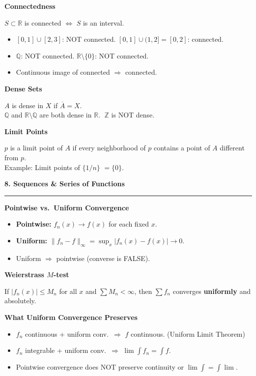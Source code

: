 \documentclass[10pt,twocolumn]{article}
\newcommand{\sect}[1]{\medskip\noindent\textbf{\large #1}\medskip\hrule\smallskip}
\newcommand{\subsect}[1]{\smallskip\noindent\textbf{#1}\par}
\begin{document}
\subsect{Connectedness}
$S\subset\mathbb{R}$ is connected $\iff$ $S$ is an interval.
\begin{itemize}[nosep,leftmargin=*]
\item $[0,1]\cup[2,3]$: NOT connected. \quad $[0,1]\cup(1,2]=[0,2]$: connected.
\item $\mathbb{Q}$: NOT connected. \quad $\mathbb{R}\setminus\{0\}$: NOT connected.
\item Continuous image of connected $\Rightarrow$ connected.
\end{itemize}

\subsect{Dense Sets}
$A$ is dense in $X$ if $\overline{A}=X$.\\
$\mathbb{Q}$ and $\mathbb{R}\setminus\mathbb{Q}$ are both dense in $\mathbb{R}$. $\;\mathbb{Z}$ is NOT dense.

\subsect{Limit Points}
$p$ is a limit point of $A$ if every neighborhood of $p$ contains a point of $A$ different from $p$.\\
Example: Limit points of $\{1/n\}$ $=\{0\}$.

\sect{8. Sequences \& Series of Functions}

\subsect{Pointwise vs.\ Uniform Convergence}
\begin{itemize}[nosep,leftmargin=*]
\item \textbf{Pointwise:} $f_n(x)\to f(x)$ for each fixed $x$.
\item \textbf{Uniform:} $\|f_n-f\|_\infty = \sup_x|f_n(x)-f(x)|\to 0$.
\item Uniform $\Rightarrow$ pointwise (converse is FALSE).
\end{itemize}

\subsect{Weierstrass $M$-test}
If $|f_n(x)|\le M_n$ for all $x$ and $\sum M_n<\infty$, then $\sum f_n$ converges \textbf{uniformly} and absolutely.

\subsect{What Uniform Convergence Preserves}
\begin{itemize}[nosep,leftmargin=*]
\item $f_n$ continuous + uniform conv.\ $\Rightarrow$ $f$ continuous. (Uniform Limit Theorem)
\item $f_n$ integrable + uniform conv.\ $\Rightarrow$ $\lim\int f_n = \int f$.
\item Pointwise convergence does NOT preserve continuity or $\lim\int=\int\lim$.
\end{itemize}
\end{document}
